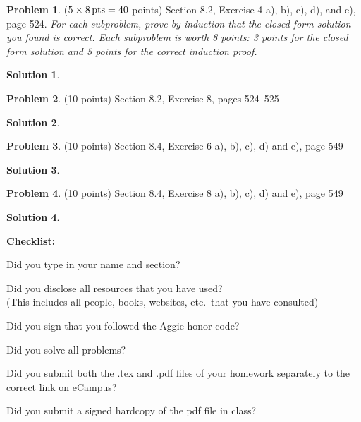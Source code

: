 \documentclass{article}
\theoremstyle{definition}
\newtheorem{problem}{Problem}
\newtheorem*{solution}{Solution}
\newcommand{\checklist}{\noindent\textbf{Checklist:}
\begin{compactitem}[$\Box$] 
\item Did you type in your name and section? 
\item Did you disclose all resources that you have used? \\
(This includes all people, books, websites, etc.\ that you have consulted)
\item Did you sign that you followed the Aggie honor code? 
\item Did you solve all problems? 
\item Did you submit both the .tex and .pdf files of your homework separately 
to the correct link on eCampus?
\item Did you submit a signed hardcopy of the pdf file in class? 
\end{compactitem}
}
\begin{document}
\begin{problem} ($5\times 8 \mbox{\,pts} = 40$ points)
Section 8.2, Exercise 4 a), b), c), d), and e), page 524.  
\textsl{For each subproblem, prove by induction that the closed form solution 
you found is correct.  Each subproblem is worth 8 points: 3 points for the closed 
form solution and 5 points for the \underline{correct} induction proof.}
\end{problem}
\begin{solution} 
\end{solution}

\begin{problem} (10 points)
Section 8.2, Exercise 8, pages 524--525
\end{problem}
\begin{solution} 
\end{solution}


\begin{problem} (10 points)
Section 8.4, Exercise 6 a), b), c), d) and e), page 549
\end{problem}
\begin{solution} 
\end{solution}

\begin{problem} (10 points)
Section 8.4, Exercise 8 a), b), c), d) and e), page 549
\end{problem}
\begin{solution} 
\end{solution}

\goodbreak
\checklist
\end{document}

